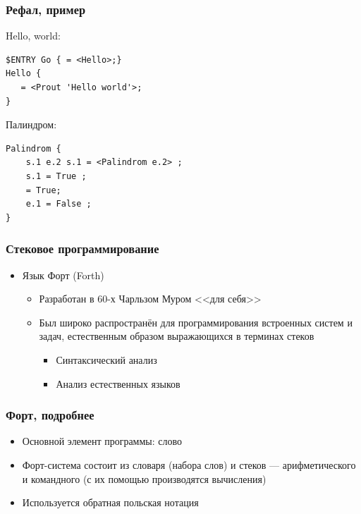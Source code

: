 \documentclass[xetex,mathserif,serif]{beamer}
\begin{document}
    \begin{frame}[fragile]
        \frametitle{Рефал, пример}
        Hello, world:
        \begin{verbatim}
$ENTRY Go { = <Hello>;}
Hello {
   = <Prout 'Hello world'>;
}
        \end{verbatim}
        \vspace{3mm}
        Палиндром:
        \begin{verbatim}
Palindrom {
    s.1 e.2 s.1 = <Palindrom e.2> ;
    s.1 = True ;
    = True;
    e.1 = False ;
}
        \end{verbatim}
    \end{frame}

    \begin{frame}
        \frametitle{Стековое программирование}
        \begin{itemize}
            \item Язык Форт (Forth)
            \begin{itemize}
                \item Разработан в 60-х Чарльзом Муром <<для себя>>
                \item Был широко распространён для программирования встроенных систем и задач, естественным образом выражающихся в терминах стеков
                \begin{itemize}
                    \item Синтаксический анализ
                    \item Анализ естественных языков
                \end{itemize}
            \end{itemize}
        \end{itemize}
    \end{frame}

    \begin{frame}
        \frametitle{Форт, подробнее}
        \begin{itemize}
            \item Основной элемент программы: слово
            \item Форт-система состоит из словаря (набора слов) и стеков --- арифметического и командного (с их помощью производятся вычисления)
            \item Используется обратная польская нотация
        \end{itemize}
    \end{frame}
\end{document}
